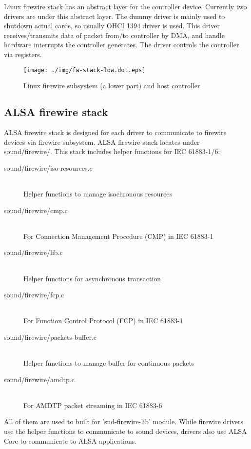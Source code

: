 \documentclass[onecolumn]{article}
\begin{document}
Linux firewire stack has an abstract layer for the controller device. Currently two drivers are under this abstract layer. The dummy driver is mainly used to shutdown actual cards, so usually OHCI 1394 driver is used. This driver receives/transmits data of packet from/to controller by DMA, and handle hardware interrupts the controller generates. The driver controls the controller via registers.

\begin{figure}[htbp]
	\centering
	\texttt{[image: ./img/fw-stack-low.dot.eps]}
	\caption{{Linux firewire subsystem (a lower part) and host controller}}
	\label{fw-stack-low}
\end{figure}

\subsection{ALSA firewire stack}

ALSA firewire stack is designed for each driver to communicate to firewire devices via firewire subsystem. ALSA firewire stack locates under sound/firewire/. This stack includes helper functions for IEC 61883-1/6:

\begin{description}
\item[sound/firewire/iso-resources.c] \mbox{} \\
   Helper functions to manage isochronous resources
\item[sound/firewire/cmp.c] \mbox{} \\
   For Connection Management Procedure (CMP) in IEC 61883-1
\item[sound/firewire/lib.c] \mbox{} \\
   Helper functions for asynchronous transaction
\item[sound/firewire/fcp.c] \mbox{} \\
   For Function Control Protocol (FCP) in IEC 61883-1
\item[sound/firewire/packets-buffer.c] \mbox{} \\
   Helper functions to manage buffer for continuous packets
\item[sound/firewire/amdtp.c] \mbox{} \\
   For AMDTP packet streaming in IEC 61883-6
\end{description}

All of them are used to built for 'snd-firewire-lib' module. While firewire drivers use the helper functions to communicate to sound devices, drivers also use ALSA Core to communicate to ALSA applications.
\end{document}
